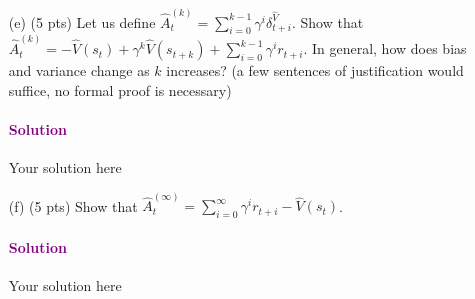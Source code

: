 \documentclass{article}
\newcommand\solution[1]{\paragraph{\textcolor{purple}{Solution}}{\color{purple} #1}}
\begin{document}
\begin{enumerate}
\item [(e) (5 pts)] Let us define $\hat{A}_t^{(k)} = \sum_{i=0}^{k-1} \gamma^i \delta^{\hat{V}}_{t + i}$. Show that $\hat{A}_t^{(k)} =  - \hat{V}(s_t) + \gamma^k \hat{V}(s_{t+k}) + \sum_{i=0}^{k-1} \gamma^i r_{t+i}$. In general, how does bias and variance change as $k$ increases? (a few sentences of justification would suffice, no formal proof is necessary)

\solution{
	Your solution here
}




\item [(f) (5 pts)] Show that $\hat{A}_t^{(\infty)} = \sum_{i=0}^{\infty} \gamma^i r_{t+i} - \hat{V}(s_t)$. 

\solution{
	Your solution here
}




\end{enumerate}

\printbibliography
\end{document}
